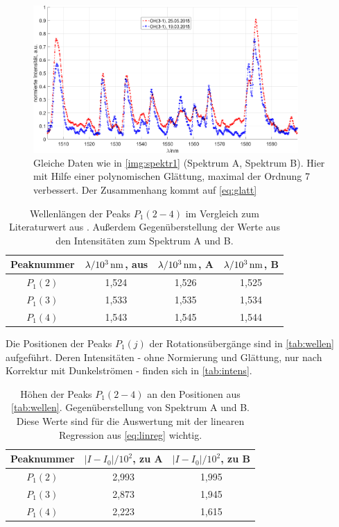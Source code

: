 \documentclass[numbers=noenddot,a4paper,notitlepage,twoside,BCOR15mm]{scrartcl}
\newcommand{\tenpo}[1]{ 10^{#1}}
\newcommand{\ix}[1]{_\text{#1}}
\begin{document}
				\begin{figure}
					\centering
					\includegraphics[width=0.9\textwidth]{spektr_smooth.png}
					\caption{Gleiche Daten wie in \autoref{img:spektr1} (Spektrum A, Spektrum B). Hier mit Hilfe einer polynomischen Glättung, maximal der Ordnung 7 verbessert. Der Zusammenhang kommt auf \autoref{eq:glatt}}
					\label{img:spektr2}
				\end{figure}

				\begin{table}
					\centering
					\begin{tabular}{c|c|c|c}
						Peaknummer & $\lambda/\unit[\tenpo{3}]{nm}$, aus \cite{EMAUGreifswaldOHRot} & $\lambda/\unit[\tenpo{3}]{nm}$, A & $\lambda/\unit[\tenpo{3}]{nm}$, B\\
						\hline $P\ix{1}(2)$ & 1,524 & 1,526 & 1,525 \\
						\hline $P\ix{1}(3)$ & 1,533 & 1,535 & 1,534 \\
						\hline $P\ix{1}(4)$ & 1,543 & 1,545 & 1,544
					\end{tabular}
					\caption{Wellenlängen der Peaks $P\ix{1}(2-4)$ im Vergleich zum Literaturwert aus \cite{EMAUGreifswaldOHRot}. Außerdem Gegenüberstellung der Werte aus den Intensitäten zum Spektrum A und B.}
					\label{tab:wellen}
				\end{table}

			Die Positionen der Peaks $P\ix{1}(j)$ der Rotationsübergänge sind in \autoref{tab:wellen} aufgeführt. Deren Intensitäten - ohne Normierung und Glättung, nur nach Korrektur mit Dunkelströmen - finden sich in \autoref{tab:intens}.

				\begin{table}
					\centering
					\begin{tabular}{c|c|c}
						Peaknummer & $|I-I\ix{0}|/\tenpo{2}$, zu A & $|I-I\ix{0}|/\tenpo{2}$, zu B\\
						\hline $P\ix{1}(2)$ & 2,993 & 1,995 \\
						\hline $P\ix{1}(3)$ & 2,873 & 1,945 \\
						\hline $P\ix{1}(4)$ & 2,223 & 1,615
					\end{tabular}
					\caption{Höhen der Peaks $P\ix{1}(2-4)$ an den Positionen aus \autoref{tab:wellen}. Gegenüberstellung von Spektrum A und B. Diese Werte sind für die Auswertung mit der linearen Regression aus \autoref{eq:linreg} wichtig.}
					\label{tab:intens}
				\end{table}
\end{document}
